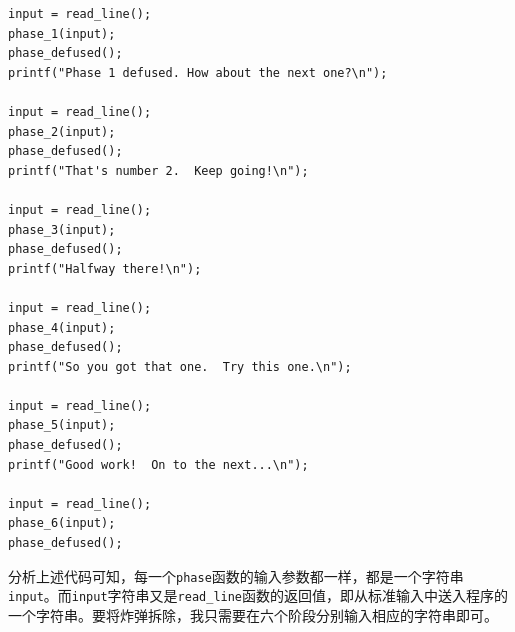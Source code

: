 \documentclass{paper}
\begin{document}
\begin{lstlisting}
input = read_line();
phase_1(input);
phase_defused();
printf("Phase 1 defused. How about the next one?\n");

input = read_line();
phase_2(input);
phase_defused();
printf("That's number 2.  Keep going!\n");

input = read_line();
phase_3(input);
phase_defused();
printf("Halfway there!\n");

input = read_line();
phase_4(input);
phase_defused();
printf("So you got that one.  Try this one.\n");

input = read_line();
phase_5(input);
phase_defused();
printf("Good work!  On to the next...\n");

input = read_line();
phase_6(input);
phase_defused();
\end{lstlisting}

分析上述代码可知，每一个\verb|phase|函数的输入参数都一样，都是一个字符串\verb|input|。而\verb|input|字符串又是\verb|read_line|函数的返回值，即从标准输入中送入程序的一个字符串。要将炸弹拆除，我只需要在六个阶段分别输入相应的字符串即可。
\end{document}
